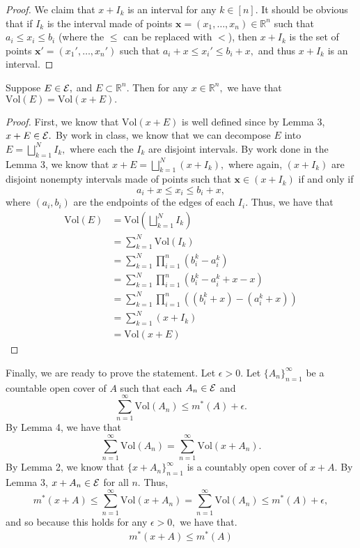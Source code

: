 \documentclass[11pt]{article}
\newcommand{\Vol}{\text{Vol}}
\newcommand{\bbR}{\mathbb{R}}
\begin{document}
\begin{solution}
\begin{proof}
        We claim that $x + I_k$ is an interval for any $k \in [n].$ It should be obvious that if $I_k$ is the interval made of points $\textbf{x} = (x_1, \dots, x_n) \in \bbR^n$ such that $a_i \leq x_i \leq b_i$ (where the $\leq$ can be replaced with $<$), then $x + I_k$ is the set of points $\textbf{x}' = (x_1', \dots, x_n')$ such that $a_i  + x \leq x_i' \leq b_i + x,$ and thus $x + I_k$ is an interval. 
    \end{proof}
    
    \begin{lemma}
        Suppose $E \in \cal E,$ and $E \subset \bbR^n.$ Then for any $x\in \bbR^n,$ we have that $\Vol(E) = \Vol(x + E).$ 
    \end{lemma}
    \begin{proof}
        First, we know that $\Vol(x + E)$ is well defined since by Lemma 3, $x + E \in \cal E.$ By work in class, we know that we can decompose $E$ into $E = \bigsqcup_{k=1}^N I_k,$ where each the $I_k$ are disjoint intervals. By work done in the Lemma 3, we know that $x + E = \bigsqcup_{k=1}^N (x + I_k),$ where again, $(x + I_k)$ are disjoint nonempty intervals made of points such that $\textbf{x} \in (x + I_k)$ if and only if 
        \[a_i  + x \leq x_i \leq b_i + x,\] where $(a_i, b_i)$ are the endpoints of the edges of each $I_i.$ Thus, we have that 
        \begin{align*}
            \Vol(E) &= \Vol(\bigsqcup_{k=1}^N I_k)\\
            &= \sum_{k=1}^N \Vol(I_k)\\
            &= \sum_{k=1}^N \prod_{i=1}^n(b_i^k - a_i^k)\\
            &= \sum_{k=1}^N \prod_{i=1}^n(b_i^k - a_i^k + x - x)\\
            &= \sum_{k=1}^N \prod_{i=1}^n((b_i^k + x) - (a_i^k + x))\\
            &= \sum_{k=1}^N (x + I_k)\\
            &= \Vol(x + E)
        \end{align*}
    \end{proof}
Finally, we are ready to prove the statement. Let $\epsilon>0.$ Let $\{A_n\}_{n=1}^\infty$ be a countable open cover of $A$ such that each $A_n \in \cal E$ and 
\[\sum_{n=1}^\infty \Vol(A_n) \leq m^*(A) + \epsilon.\] By Lemma 4, we have that 
\[\sum_{n=1}^\infty \Vol(A_n) = \sum_{n=1}^\infty\Vol(x + A_n).\] By Lemma 2, we know that $\{x + A_n\}_{n=1}^\infty$ is a countably open cover of $x + A.$ By Lemma 3, $x + A_n \in \cal E$ for all $n.$ Thus, 
\[m^*(x + A) \leq\sum_{n=1}^\infty\Vol(x + A_n) =\sum_{n=1}^\infty \Vol(A_n) \leq m^*(A) + \epsilon,\] and so because this holds for any $\epsilon>0,$ we have that.
\begin{align}
    m^*(x + A) \leq m^*(A)
\end{align}


\end{solution}
\end{document}
